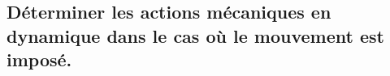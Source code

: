 \subsection{Déterminer les actions mécaniques en dynamique dans le cas où le mouvement est imposé.}
\renewcommand{\repExo}{../../ExercicesCompetences/C2_MettreEnOeuvreDemarche/C2_08_TorseurDynamique}

\renewcommand{\td}{01_T}
\graphicspath{{\repStyle/png/}{\repExo/\td/images/}}


\renewcommand{\td}{02_R}
\graphicspath{{\repStyle/png/}{\repExo/\td/images/}}


\renewcommand{\td}{03_TT}
\graphicspath{{\repStyle/png/}{\repExo/\td/images/}}


\renewcommand{\td}{04_RR}
\graphicspath{{\repStyle/png/}{\repExo/\td/images/}}


\renewcommand{\td}{05_RT}
\graphicspath{{\repStyle/png/}{\repExo/\td/images/}}


\renewcommand{\td}{06_TR}
\graphicspath{{\repStyle/png/}{\repExo/\td/images/}}


\renewcommand{\td}{07_RR3D}
\graphicspath{{\repStyle/png/}{\repExo/\td/images/}}


\renewcommand{\td}{08_RR3D}
\graphicspath{{\repStyle/png/}{\repExo/\td/images/}}


\renewcommand{\td}{09_RT_RSG}
\graphicspath{{\repStyle/png/}{\repExo/\td/images/}}


\renewcommand{\td}{50_BancBalafre}
\graphicspath{{\repStyle/png/}{\repExo/\td/images/}}

%
%
%
%
%
%
%
%
%
%
%
%
%
%
%
%
